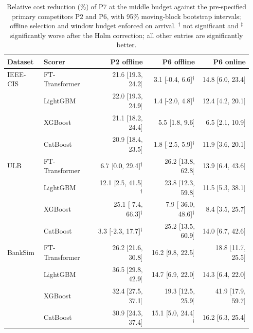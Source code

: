 \begin{table}[t]
\centering
\caption{Relative cost reduction (\%) of P7 at the middle budget against the pre-specified primary competitors P2 and P6, with 95\% moving-block bootstrap intervals; offline selection and window budget enforced on arrival. $^{\dagger}$ not significant and $^{\ddagger}$ significantly worse after the Holm correction; all other entries are significantly better.}
\label{tab:effects}
\begin{tabular}{llrrr}
\toprule
Dataset & Scorer & P2 offline & P6 offline & P6 online \\
\midrule
IEEE-CIS & FT-Transformer & 21.6 [19.3, 24.2] & 3.1 [-0.4, 6.6]$^{\dagger}$ & 14.8 [6.0, 23.4] \\
 & LightGBM & 22.0 [19.3, 24.9] & 1.4 [-2.0, 4.8]$^{\dagger}$ & 12.4 [4.2, 20.1] \\
 & XGBoost & 21.1 [18.2, 24.4] & 5.5 [1.8, 9.6] & 6.5 [2.1, 10.9] \\
 & CatBoost & 20.9 [18.4, 23.5] & 1.8 [-2.5, 5.9]$^{\dagger}$ & 11.9 [3.6, 20.1] \\
ULB & FT-Transformer & 6.7 [0.0, 29.4]$^{\dagger}$ & 26.2 [13.8, 62.8] & 13.9 [6.4, 43.6] \\
 & LightGBM & 12.1 [2.5, 41.5]$^{\dagger}$ & 23.8 [12.3, 59.8] & 11.5 [5.3, 38.1] \\
 & XGBoost & 25.1 [-7.4, 66.3]$^{\dagger}$ & 7.9 [-36.0, 48.6]$^{\dagger}$ & 8.4 [3.5, 25.7] \\
 & CatBoost & 3.3 [-2.3, 17.7]$^{\dagger}$ & 25.2 [13.5, 60.9] & 14.0 [6.7, 42.6] \\
BankSim & FT-Transformer & 26.2 [21.6, 30.8] & 16.2 [9.8, 22.5] & 18.8 [11.7, 25.5] \\
 & LightGBM & 36.5 [29.8, 42.9] & 14.7 [6.9, 22.0] & 14.3 [6.4, 22.0] \\
 & XGBoost & 32.4 [27.5, 37.1] & 19.3 [12.5, 25.9] & 41.9 [17.9, 59.7] \\
 & CatBoost & 30.9 [24.3, 37.4] & 15.1 [5.0, 24.4]$^{\dagger}$ & 16.2 [6.3, 25.4] \\
\bottomrule
\end{tabular}
\end{table}
